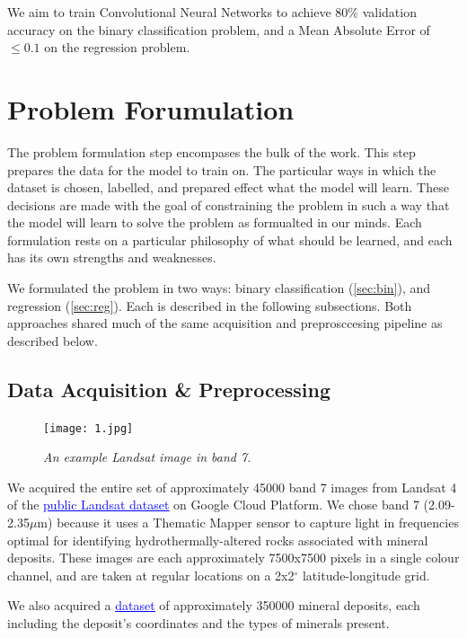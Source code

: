 \documentclass[10pt]{article}
\begin{document}
We aim to train Convolutional Neural Networks to achieve 80\% validation accuracy
on the binary classification problem, and a Mean Absolute Error of $\leq 0.1$
on the regression problem.

\section{Problem Forumulation}\label{sec:pf}

The problem formulation step encompases the bulk of the work. This step prepares
the data for the model to train on. The particular ways in which the dataset
is chosen, labelled, and prepared effect what the model will learn. These
decisions are made with the goal of constraining the problem in such a way that
the model will learn to solve the problem as formualted in our minds. Each
formulation rests on a particular philosophy of what should be learned, and each
has its own strengths and weaknesses.

We formulated the problem in two ways: binary classification (\ref{sec:bin}), and regression (\ref{sec:reg}). Each
is described in the following subsections. Both approaches shared much of the
same acquisition and preprosccesing pipeline as described below.

\subsection{Data Acquisition \& Preprocessing}

\begin{figure}
  \centering
  \texttt{[image: 1.jpg]}
  \caption{\textit{An example Landsat image in band 7.}}
  \label{fig:example_image}
\end{figure}

We acquired the entire set of approximately 45000 band 7 images from Landsat 4 of the
\href{https://console.cloud.google.com/marketplace/product/usgs-public-data/landast}{\textcolor{blue}{\underline{public Landsat dataset}}}
on Google Cloud Platform. We chose band 7 (2.09-2.35$\mu$m) because it uses a
Thematic Mapper sensor to capture light in frequencies optimal for identifying
hydrothermally-altered rocks associated with mineral deposits. These images are
each approximately 7500x7500 pixels in a single colour channel, and are taken
at regular locations on a 2x2$^\circ$ latitude-longitude grid.

We also acquired a \href{https://www.kaggle.com/datasets/thedevastator/mineral-ores-around-the-world}{\textcolor{blue}{\underline{dataset}}}
of approximately 350000 mineral deposits, each including the deposit's coordinates
and the types of minerals present. 
\end{document}
